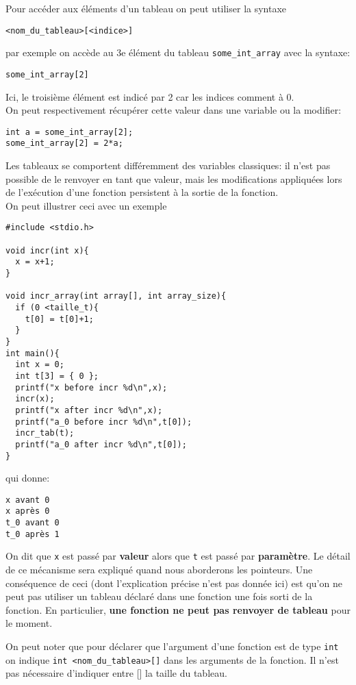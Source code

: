 \documentclass[11pt]{article}
\begin{document}
Pour accéder aux éléments d'un tableau on peut utiliser la syntaxe
\begin{verbatim}
<nom_du_tableau>[<indice>]
\end{verbatim}
par exemple on accède au 3e élément du tableau \texttt{some\_int\_array} avec la syntaxe:
\begin{verbatim}
some_int_array[2]
\end{verbatim}
Ici, le troisième élément est indicé par 2 car les indices comment à 0.\\

On peut respectivement récupérer cette valeur dans une variable ou la modifier:
\begin{verbatim}
int a = some_int_array[2];
some_int_array[2] = 2*a;
\end{verbatim}

Les tableaux se comportent différemment des variables classiques: il n'est pas possible de le renvoyer en tant que valeur, mais les modifications appliquées lors de l'exécution d'une fonction persistent à la sortie de la fonction.\\

On peut illustrer ceci avec un exemple
\begin{verbatim}
#include <stdio.h>

void incr(int x){
  x = x+1;
}

void incr_array(int array[], int array_size){
  if (0 <taille_t){
    t[0] = t[0]+1;
  }
}
int main(){
  int x = 0;
  int t[3] = { 0 };
  printf("x before incr %d\n",x);
  incr(x);
  printf("x after incr %d\n",x);
  printf("a_0 before incr %d\n",t[0]);
  incr_tab(t);
  printf("a_0 after incr %d\n",t[0]);
}
\end{verbatim}

qui donne:

\begin{verbatim}
x avant 0
x après 0
t_0 avant 0
t_0 après 1
\end{verbatim}


On dit que \texttt{x} est passé par \textbf{valeur} alors que \texttt{t} est passé par \textbf{paramètre}. Le détail de ce mécanisme sera expliqué quand nous aborderons les pointeurs. Une conséquence de ceci (dont l'explication précise n'est pas donnée ici) est qu'on ne peut pas utiliser un tableau déclaré dans une fonction une fois sorti de la fonction. En particulier, \textbf{une fonction ne peut pas renvoyer de tableau} pour le moment.

On peut noter que pour déclarer que l'argument d'une fonction est de type \texttt{int} on indique \texttt{int <nom\_du\_tableau>[]} dans les arguments de la fonction. Il n'est pas nécessaire d'indiquer entre [] la taille du tableau.
\end{document}
